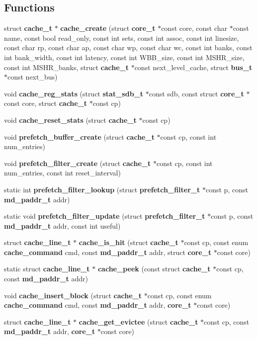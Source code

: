 \subsection*{Functions}
\begin{CompactItemize}
\item 
struct {\bf cache\_\-t} $\ast$ {\bf cache\_\-create} (struct {\bf core\_\-t} $\ast$const core, const char $\ast$const name, const bool read\_\-only, const int sets, const int assoc, const int linesize, const char rp, const char ap, const char wp, const char wc, const int banks, const int bank\_\-width, const int latency, const int WBB\_\-size, const int MSHR\_\-size, const int MSHR\_\-banks, struct {\bf cache\_\-t} $\ast$const next\_\-level\_\-cache, struct {\bf bus\_\-t} $\ast$const next\_\-bus)
\item 
void {\bf cache\_\-reg\_\-stats} (struct {\bf stat\_\-sdb\_\-t} $\ast$const sdb, const struct {\bf core\_\-t} $\ast$const core, struct {\bf cache\_\-t} $\ast$const cp)
\item 
void {\bf cache\_\-reset\_\-stats} (struct {\bf cache\_\-t} $\ast$const cp)
\item 
void {\bf prefetch\_\-buffer\_\-create} (struct {\bf cache\_\-t} $\ast$const cp, const int num\_\-entries)
\item 
void {\bf prefetch\_\-filter\_\-create} (struct {\bf cache\_\-t} $\ast$const cp, const int num\_\-entries, const int reset\_\-interval)
\item 
static int {\bf prefetch\_\-filter\_\-lookup} (struct {\bf prefetch\_\-filter\_\-t} $\ast$const p, const {\bf md\_\-paddr\_\-t} addr)
\item 
static void {\bf prefetch\_\-filter\_\-update} (struct {\bf prefetch\_\-filter\_\-t} $\ast$const p, const {\bf md\_\-paddr\_\-t} addr, const int useful)
\item 
struct {\bf cache\_\-line\_\-t} $\ast$ {\bf cache\_\-is\_\-hit} (struct {\bf cache\_\-t} $\ast$const cp, const enum {\bf cache\_\-command} cmd, const {\bf md\_\-paddr\_\-t} addr, struct {\bf core\_\-t} $\ast$const core)
\item 
static struct {\bf cache\_\-line\_\-t} $\ast$ {\bf cache\_\-peek} (const struct {\bf cache\_\-t} $\ast$const cp, const {\bf md\_\-paddr\_\-t} addr)
\item 
void {\bf cache\_\-insert\_\-block} (struct {\bf cache\_\-t} $\ast$const cp, const enum {\bf cache\_\-command} cmd, const {\bf md\_\-paddr\_\-t} addr, {\bf core\_\-t} $\ast$const core)
\item 
struct {\bf cache\_\-line\_\-t} $\ast$ {\bf cache\_\-get\_\-evictee} (struct {\bf cache\_\-t} $\ast$const cp, const {\bf md\_\-paddr\_\-t} addr, {\bf core\_\-t} $\ast$const core)

\end{CompactItemize}
